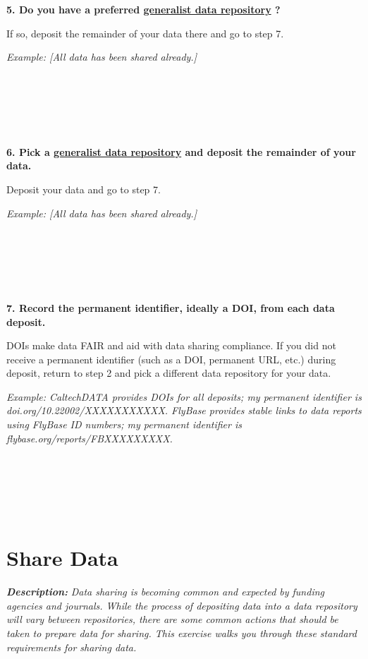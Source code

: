 \documentclass[
]{book}
\begin{document}
~

~

\textbf{5. Do you have a preferred \href{https://sharing.nih.gov/data-management-and-sharing-policy/sharing-scientific-data/generalist-repositories}{generalist data repository} \citep{nih_generalist_2023}?}

If so, deposit the remainder of your data there and go to step 7.

\emph{Example: {[}All data has been shared already.{]}}

~

~

~

\textbf{6. Pick a \href{https://sharing.nih.gov/data-management-and-sharing-policy/sharing-scientific-data/generalist-repositories}{generalist data repository} \citep{nih_generalist_2023} and deposit the remainder of your data.}

Deposit your data and go to step 7.

\emph{Example: {[}All data has been shared already.{]}}

~

~

~

\textbf{7. Record the permanent identifier, ideally a DOI, from each data deposit.}

DOIs make data FAIR \citep{wilkinson_fair_2016} and aid with data sharing compliance. If you did not receive a permanent identifier (such as a DOI, permanent URL, etc.) during deposit, return to step 2 and pick a different data repository for your data.

\emph{Example: CaltechDATA provides DOIs for all deposits; my permanent identifier is doi.org/10.22002/XXXXXXXXXXX. FlyBase provides stable links to data reports using FlyBase ID numbers; my permanent identifier is flybase.org/reports/FBXXXXXXXXX.}

~

~

~

\newpage

\hypertarget{share-data}{%
\section{Share Data}\label{share-data}}

\textbf{\emph{Description:}} \emph{Data sharing is becoming common and expected by funding agencies and journals. While the process of depositing data into a data repository will vary between repositories, there are some common actions that should be taken to prepare data for sharing. This exercise walks you through these standard requirements for sharing data.}
\end{document}
